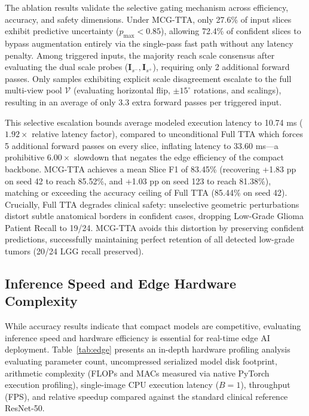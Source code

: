 The ablation results validate the selective gating mechanism across efficiency, accuracy, and safety dimensions. Under MCG-TTA, only 27.6\% of input slices exhibit predictive uncertainty ($p_{\max} < 0.85$), allowing 72.4\% of confident slices to bypass augmentation entirely via the single-pass fast path without any latency penalty. Among triggered inputs, the majority reach scale consensus after evaluating the dual scale probes ($\mathbf{I}_{s^-}, \mathbf{I}_{s^+}$), requiring only 2 additional forward passes. Only samples exhibiting explicit scale disagreement escalate to the full multi-view pool $\mathcal{V}$ (evaluating horizontal flip, $\pm 15^\circ$ rotations, and scalings), resulting in an average of only 3.3 extra forward passes per triggered input.

This selective escalation bounds average modeled execution latency to 10.74 ms ($1.92\times$ relative latency factor), compared to unconditional Full TTA which forces 5 additional forward passes on every slice, inflating latency to 33.60 ms---a prohibitive $6.00\times$ slowdown that negates the edge efficiency of the compact backbone. MCG-TTA achieves a mean Slice F1 of 83.45\% (recovering +1.83 pp on seed 42 to reach 85.52\%, and +1.03 pp on seed 123 to reach 81.38\%), matching or exceeding the accuracy ceiling of Full TTA (85.44\% on seed 42). Crucially, Full TTA degrades clinical safety: unselective geometric perturbations distort subtle anatomical borders in confident cases, dropping Low-Grade Glioma Patient Recall to 19/24. MCG-TTA avoids this distortion by preserving confident predictions, successfully maintaining perfect retention of all detected low-grade tumors (20/24 LGG recall preserved).

\subsection{Inference Speed and Edge Hardware Complexity}

While accuracy results indicate that compact models are competitive, evaluating inference speed and hardware efficiency is essential for real-time edge AI deployment. Table~\ref{tab:edge} presents an in-depth hardware profiling analysis evaluating parameter count, uncompressed serialized model disk footprint, arithmetic complexity (FLOPs and MACs measured via native PyTorch execution profiling), single-image CPU execution latency ($B=1$), throughput (FPS), and relative speedup compared against the standard clinical reference ResNet-50.

